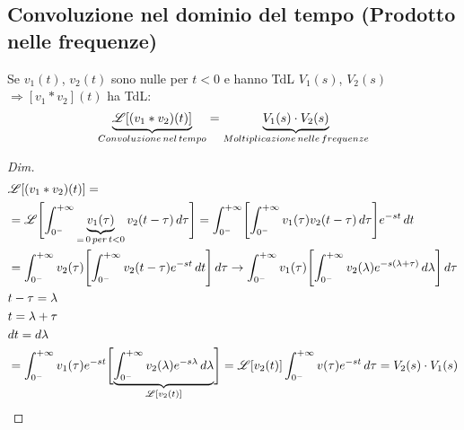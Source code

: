 \subsection{Convoluzione nel dominio del tempo (Prodotto nelle frequenze)}
Se $v_1(t)$, $v_2(t)$ sono nulle per $t < 0$ e hanno TdL $V_1(s)$, $V_2(s)$ $\Rightarrow [v_1 * v_2](t)$ ha TdL:\\
\[
   \underbrace{\mathscr{L}[(v_1 * v_2)(t)]}_{Convoluzione\, nel\, tempo} = \underbrace{V_1(s)\cdot V_2(s)}_{Moltiplicazione\, nelle\, frequenze}
\]
\begin{proof}[Dim]
   \[
      \begin{split}
         &\mathscr{L}[(v_1 * v_2)(t)] =\\
         & = \mathscr{L}\Biggl[\int_{0^-}^{+\infty} \underbrace{v_1(\tau)}_{=\, 0\, per\, t < 0}v_2(t - \tau)\,d\tau\Biggr] = \int_{0^-}^{+\infty}\Biggl[\int_{0^-}^{+\infty} v_1(\tau)v_2(t - \tau)\,d\tau\Biggr]e^{-st}\,dt\\
         & = \int_{0^-}^{+\infty} v_2(\tau)\Biggl[\int_{0^-}^{+\infty} v_2(t - \tau)e^{-st}\,dt\Biggr]\,d\tau \rightarrow \int_{0^-}^{+\infty} v_1(\tau)\Biggl[\int_{0^-}^{+\infty} v_2(\lambda)e^{-s(\lambda + \tau)}\,d\lambda\Biggr]\,d\tau \\
         & t - \tau = \lambda \\
         & t = \lambda + \tau \\
         & dt = d\lambda \\
         & = \int_{0^-}^{+\infty} v_1(\tau)e^{-st}\Biggl[\underbrace{\int_{0^-}^{+\infty} v_2(\lambda)e^{-s\lambda}\,d\lambda}_{\mathscr{L}[v_2(t)]}\Biggr] = \mathscr{L}[v_2(t)]\int_{0^-}^{+\infty} v(\tau)e^{-st}\,d\tau = V_2(s)\cdot V_1(s)
      \end{split}
   \]
\end{proof}


